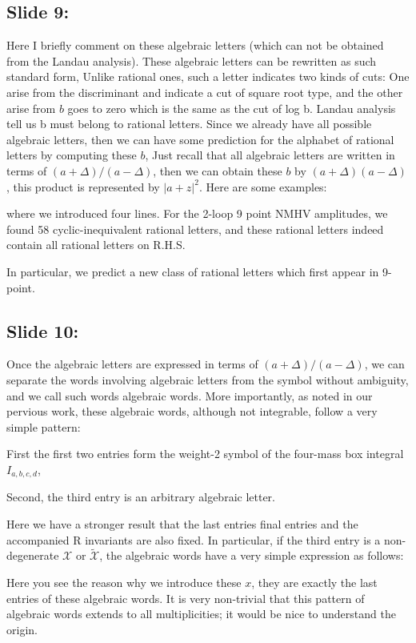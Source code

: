 \documentclass[a4paper,11pt]{article}
\begin{document}
\subsection{Slide 9:}

Here I briefly comment on these algebraic letters (which can not be obtained from the Landau analysis). These algebraic letters can be rewritten as such standard form, Unlike rational ones, such a letter indicates two kinds of cuts: One arise from the discriminant and indicate a cut of square root type, and the other arise from $b$ goes to zero which is the same as the cut of log b. Landau analysis tell us b must belong to rational letters. Since we already have all possible algebraic letters, then we can have some prediction for  the alphabet of rational letters by computing these $b$, Just recall that all algebraic letters are written in terms of $(a+\Delta)/(a-\Delta)$, then we can obtain these $b$ by $(a+\Delta)(a-\Delta)$, this product is represented by $|a+z|^{2}$. Here are some examples: 

where we introduced four lines. For the 2-loop 9 point  NMHV amplitudes, we found 58 cyclic-inequivalent rational letters, and these rational letters indeed contain all rational letters on R.H.S. 

In particular, we predict a new class of rational letters which first appear in 9-point. 

\subsection{Slide 10:}

Once the algebraic letters are expressed in terms of $(a+\Delta)/(a-\Delta)$, we can separate the words involving algebraic letters from the symbol without ambiguity, and we call such words algebraic words. More importantly, as noted in our pervious work, these algebraic words, although not integrable, follow a very simple pattern:

First the first two entries form the weight-2 symbol of the four-mass box integral $I_{a,b,c,d}$, 

Second, the third entry is an arbitrary algebraic letter. 

Here we have a stronger result that the last entries final entries and the accompanied R invariants are also fixed. In particular, if the third entry is a non-degenerate $\mathcal{X}$ or $\tilde{\mathcal{X}}$, the algebraic words have a very simple expression as follows:

Here you see the reason why we introduce these $x$, they are exactly the last entries of these algebraic words. It is very non-trivial that this pattern of algebraic words extends to all multiplicities; it would be nice to understand the origin. 
\end{document}
